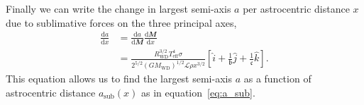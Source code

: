 \documentclass[fleqn,usenatbib]{mnras}
\begin{document}
Finally we can write the change in largest semi-axis $a$ per astrocentric distance $x$ due to sublimative forces on the three principal axes,
\begin{equation}
    \begin{aligned}
        \label{eq:achange_astrodist}
        \frac{\mathrm{d}a}{\mathrm{d}x} &=
        \frac{\mathrm{d}a}{\mathrm{d}\mathbfit{M}}\frac{\mathrm{d}\mathbfit{M}}{\mathrm{d}x} \\ 
        &= \frac{R_\text{WD}^{3/2} T_\text{eff}^4 \sigma}{2^{5/2} (GM_\text{WD})^{1/2} \mathcal{L} \rho x^{3/2}} \left[ \hat{i} + \frac{1}{\mathfrak{b}} \hat{j} + \frac{1}{\mathfrak{c}}\hat{k} \right].
    \end{aligned}
\end{equation}
This equation allows us to find the largest semi-axis $a$ as a function of astrocentric distance $a_\text{sub}(x)$ as in equation~\ref{eq:a_sub}.
\end{document}
